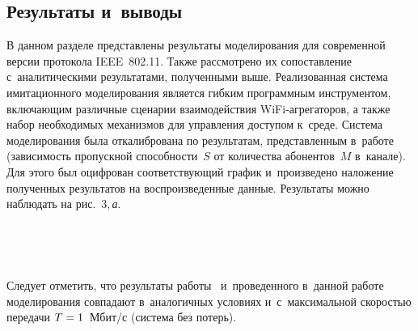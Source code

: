 \begin{multicols}{2}
\section{Результаты и~выводы}
     
    В данном разделе представлены результаты моделирования для 
современной версии протокола IEEE~802.11. Также рассмотрено их 
сопоставление с~аналитическими результатами, полученными выше. 
Реализованная система имитационного моделирования является гибким 
программным инструментом, включающим различные сценарии 
взаимодействия WiFi-агре\-га\-то\-ров, а также набор необходимых 
механизмов для управления доступом к~среде. Система моделирования 
была откалибрована по результатам, представленным 
    в~работе~\cite{8-om} (зависимость пропускной способности~$S$ от 
количества абонентов~$M$ в~канале). Для этого был оцифрован 
соответствующий график и~произведено наложение полученных 
результатов на воспроизведенные данные. Результаты можно наблюдать 
на рис.~3,\,\textit{а}. 

\begin{figure*} %
\vspace*{1pt}
 \begin{center}  
\mbox{%
 \epsfxsize=162.694mm
 }
\end{center} 
\vspace*{-9pt}
      \vspace*{8pt}
      \end{figure*}
           \begin{figure*}[b] %
     \vspace*{8pt}
 \begin{center}  
\mbox{%
 \epsfxsize=103.26mm
 }
\end{center} 
\vspace*{-9pt}
      \end{figure*}
     
    Следует отметить, что результаты работы~\cite{8-om} 
и~проведенного в~данной работе моделирования совпадают 
в~аналогичных условиях и~с~максимальной скоростью передачи 
$T\hm=1$~Мбит/с (система без потерь). 
    

\end{multicols}
